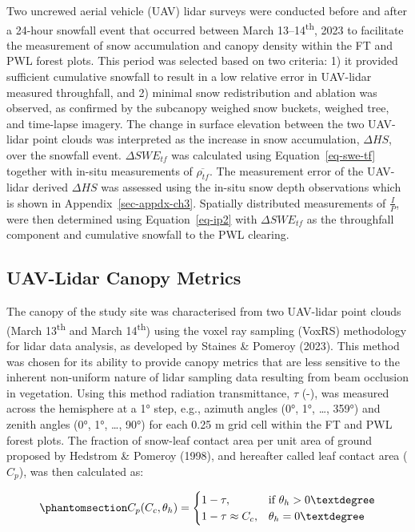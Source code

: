 \documentclass[
  letterpaper,
]{tex/uofsthesis-cs}
\begin{document}
Two uncrewed aerial vehicle (UAV) lidar surveys were conducted before
and after a 24-hour snowfall event that occurred between March
13--14\textsuperscript{th}, 2023 to facilitate the measurement of snow
accumulation and canopy density within the FT and PWL forest plots. This
period was selected based on two criteria: 1) it provided sufficient
cumulative snowfall to result in a low relative error in UAV-lidar
measured throughfall, and 2) minimal snow redistribution and ablation
was observed, as confirmed by the subcanopy weighed snow buckets,
weighed tree, and time-lapse imagery. The change in surface elevation
between the two UAV-lidar point clouds was interpreted as the increase
in snow accumulation, \(\Delta HS\), over the snowfall event.
\(\Delta SWE_{tf}\) was calculated using Equation~\ref{eq-swe-tf}
together with in-situ measurements of \(\overline{\rho_{tf}}\). The
measurement error of the UAV-lidar derived \(\Delta HS\) was assessed
using the in-situ snow depth observations which is shown in
Appendix~\ref{sec-appdx-ch3}. Spatially distributed measurements of
\(\frac{I}{P}\), were then determined using Equation~\ref{eq-ip2} with
\(\Delta SWE_{tf}\) as the throughfall component and cumulative snowfall
to the PWL clearing.

\subsection{UAV-Lidar Canopy Metrics}\label{uav-lidar-canopy-metrics}

The canopy of the study site was characterised from two UAV-lidar point
clouds (March 13\textsuperscript{th} and March 14\textsuperscript{th})
using the voxel ray sampling (VoxRS) methodology for lidar data
analysis, as developed by Staines \& Pomeroy (2023). This method was
chosen for its ability to provide canopy metrics that are less sensitive
to the inherent non-uniform nature of lidar sampling data resulting from
beam occlusion in vegetation. Using this method radiation transmittance,
\(\tau\) (-), was measured across the hemisphere at a 1° step, e.g.,
azimuth angles (0°, 1°, \ldots, 359°) and zenith angles (0°, 1°, \ldots,
90°) for each 0.25 m grid cell within the FT and PWL forest plots. The
fraction of snow-leaf contact area per unit area of ground proposed by
Hedstrom \& Pomeroy (1998), and hereafter called leaf contact area
(\(C_p\)), was then calculated as:

\begin{equation}\phantomsection\label{eq-cp-lidar}{
C_p(C_c, \theta_h) = \begin{cases}
    1-\tau,& \text{if } \theta_h> 0°\\
    1-\tau \approx C_c ,              & \theta_h= 0°
\end{cases}
}\end{equation}
\end{document}
